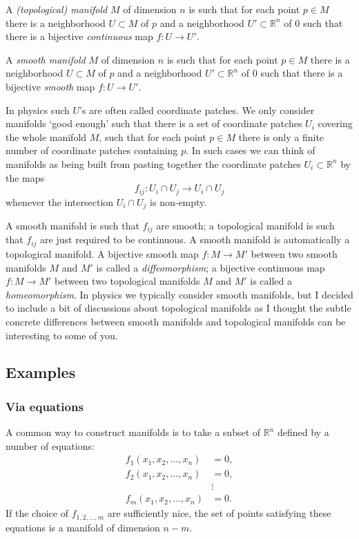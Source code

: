 \documentclass[12pt]{article}
\numberwithin{equation}{section}
\def\bR{\mathbb{R}}
\begin{document}
\begin{definition}
A \emph{(topological) manifold} $M$ of dimension $n$ is such that for each point $p\in M$ there is a neighborhood $U\subset M$ of $p$ and a neighborhood $U'\subset \bR^n$ of $0$ such that 
there is a bijective \emph{continuous} map $f:U\to U'$.
\end{definition}

\begin{definition}
  A \emph{smooth manifold} $M$ of dimension $n$ is such that for each point $p\in M$ there is a neighborhood $U\subset M$ of $p$ and a neighborhood $U'\subset \bR^n$ of $0$ such that 
  there is a bijective \emph{smooth} map $f:U\to U'$.  
\end{definition}

In physics such $U$'s are often called coordinate patches. 
We only consider manifolds `good enough' such that 
there is a set of coordinate patches $U_i$ covering the whole manifold $M$,
such that for each point $p\in M$ there is only a finite number of coordinate patches containing $p$.
In such cases we can think of manifolds as being built from
pasting together the coordinate patches $U_i \subset \bR^n$
by the maps \begin{equation}
f_{ij}: U_i\cap U_j \to U_i\cap U_j
\end{equation} whenever the intersection $U_i\cap U_j$ is non-empty.

A smooth manifold is such that $f_{ij}$ are smooth;
a topological manifold is such that $f_{ij}$ are just required to be continuous.
A smooth manifold is automatically a topological manifold.
A bijective smooth map $f:M\to M'$ between two smooth manifolds $M$ and $M'$
is called a \emph{diffeomorphism};
a bijective continuous map $f:M\to M'$ between two topological manifolds $M$ and $M'$
is called a \emph{homeomorphism}.
In physics we typically consider smooth manifolds,
but I decided to include a bit of discussions about topological manifolds
as I thought the subtle concrete differences between smooth manifolds
and topological manifolds can be interesting to some of you.

\subsection{Examples}

\subsubsection{Via equations}
A common way to construct manifolds is to take a subset of $\bR^n$ defined by a number of equations:
\begin{align}
f_1(x_1, x_2, \ldots, x_n) &= 0, \\
f_2(x_1, x_2, \ldots, x_n) &= 0, \\
&\vdots \\
f_m(x_1, x_2, \ldots, x_n) &= 0.
\end{align}
If the choice of $f_{1,2,\ldots,m}$ are sufficiently nice,
the set of points satisfying these equations is a manifold of dimension $n-m$.
\end{document}
